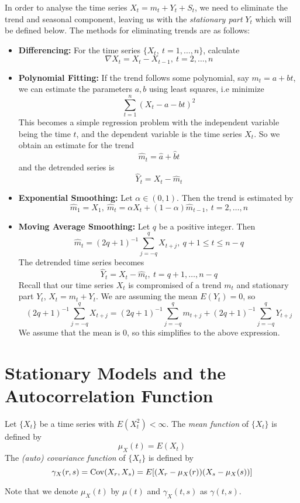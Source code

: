 In order to analyse the time series $X_t = m_t + Y_t + S_t$, we need to eliminate the trend and seasonal component, leaving us with the \textit{stationary part} $Y_t$ which will be defined below. The methods for eliminating trends are as follows:

\begin{itemize}
    \item \textbf{Differencing:} For the time series $\{X_t,\ t=1,\ldots, n\}$, calculate
    \[\nabla X_t = X_t - X_{t-1}, \ t = 2,\ldots,n\]
    \item \textbf{Polynomial Fitting:} If the trend follows some polynomial, say $m_t = a + bt$, we can estimate the parameters $a,b$ using least squares, i.e minimize
    \[\sum_{t=1}^n (X_t - a - bt)^2\]
    This becomes a simple regression problem with the independent variable being the time $t$, and the dependent variable is the time series $X_t$. So we obtain an estimate for the trend 
    \[\hat{m}_t = \hat{a}+\hat{b}t\]
    and the detrended series is
    \[\hat{Y}_t = X_t - \hat{m}_t\]
    \item \textbf{Exponential Smoothing:} Let $\alpha \in (0,1)$. Then the trend is estimated by 
    \[\hat{m}_1 = X_1, \ \hat{m}_t = \alpha X_t + (1-\alpha)\hat{m}_{t-1}, \ t=2,\ldots,n\]
    \item \textbf{Moving Average Smoothing:} Let $q$ be a positive integer. Then 
    \[\hat{m}_t = (2q+1)^{-1}\sum_{j=-q}^q X_{t+j}, \ q+1 \leq t \leq n-q\]
    The detrended time series becomes 
    \[\hat{Y}_t = X_t - \hat{m}_t, \ t = q+1, \ldots, n-q\]
    Recall that our time series $X_t$ is compromised of a trend $m_t$ and stationary part $Y_t$, $X_t = m_t + Y_t$. We are assuming the mean $E(Y_t) = 0$, so 
    \[(2q+1)^{-1}\sum_{j=-q}^q X_{t+j} = (2q+1)^{-1}\sum_{j=-q}^q m_{t+j} + (2q+1)^{-1}\sum_{j=-q}^q Y_{t+j}\]
    We assume that the mean is 0, so this simplifies to the above expression.

\end{itemize}


\section{Stationary Models and the Autocorrelation Function}


\begin{definition}
    Let $\{X_t\}$ be a time series with $E(X_t^2) < \infty$. The \emph{mean function} of $\{X_t\}$ is defined by
    \[\mu_X(t) = E(X_t)\]
    The \emph{(auto) covariance function} of $\{X_t\}$ is defined by
    \[\gamma_X(r,s) = \operatorname{Cov}(X_r,X_s) = E[(X_r - \mu_X(r))(X_s-\mu_X(s))]\]
\end{definition}
\noindent
Note that we denote $\mu_X(t)$ by $\mu(t)$ and $\gamma_X(t,s)$ as $\gamma(t,s)$.
